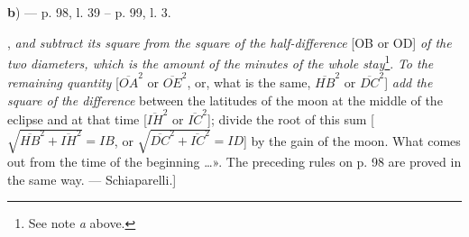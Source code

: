 \documentclass[11pt]{article}
\begin{document}
\begin{center}\end{center}
\par [Al-Battānī uses the word \emph{stay} in various senses. Let O be the centre of the shadow, \emph{b} the centre of the moon at the middle of the eclipse, \emph{a} the centre of the moon at the end of totality, \emph{c} at the beginning. Here and on p. 98, l. 36, the \emph{minutes of the stay} are the quantity AK by which the magnitude of the total eclipse exceeds 12 digits; but on p. 98, l. 6, and often elsewhere, the \emph{minutes of the stay} are 1/2 the length \emph{bc} of the path that the moon runs within the shadow from the beginning to the end of totality. The \emph{hours of the stay}, or \emph{time of the stay}, give the interval of time in which the moon comes from \emph{b} to \emph{a}, namely half the time of totality. Lastly, he calls \emph{the whole stay} the greatest value of the stay, which answers to a central eclipse; it is therefore half the difference of the diameters of the shadow and the moon. — Schiaparelli.]\par
\par\begin{center}\textbf{b}) — p. 98, l. 39 – p. 99, l. 3.\end{center}
\par [The words printed in italics teem with several errors arising from the carelessness of the copyists. The probable restoration, as appears easily from the figure, is this: «From this motion, as we have seen, learn the latitude of the moon at both times [BA or DE], \emph{and subtract its square from the square of the half-difference} [OB or OD] \emph{of the two diameters, which is the amount of the minutes of the whole stay}\footnote{See note \emph{a} above.}. \emph{To the remaining quantity} [$\overline{OA}^{2}$ or $\overline{OE}^{2}$, or, what is the same, $\overline{HB}^{2}$ or $\overline{DC}^{2}$] \emph{add the square of the difference} between the latitudes of the moon at the middle of the eclipse and at that time [$\overline{IH}^{2}$ or $\overline{IC}^{2}$]; divide the root of this sum [$\sqrt{\overline{HB}^{2} + \overline{IH}^{2}} = IB$, or $\sqrt{\overline{DC}^{2} + \overline{IC}^{2}} = ID$] by the gain of the moon. What comes out from the time of the beginning …». The preceding rules on p. 98 are proved in the same way. — Schiaparelli.]\par
\begin{center}\end{center}
\end{document}
